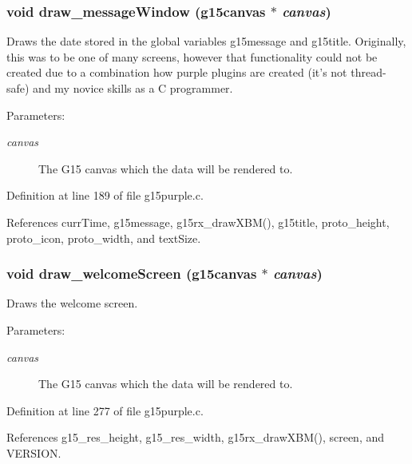 \subsubsection{\setlength{\rightskip}{0pt plus 5cm}void draw\_\-messageWindow (g15canvas $\ast$ {\em canvas})}\label{g15purple_8c_a5eb4e1291b0ae7558e4130a1c4a96eb}


Draws the date stored in the global variables g15message and g15title. Originally, this was to be one of many screens, however that functionality could not be created due to a combination how purple plugins are created (it's not thread-safe) and my novice skills as a C programmer.

\begin{Desc}
\item[Parameters:]
\begin{description}
\item[{\em canvas}]The G15 canvas which the data will be rendered to. \end{description}
\end{Desc}


Definition at line 189 of file g15purple.c.

References currTime, g15message, g15rx\_\-drawXBM(), g15title, proto\_\-height, proto\_\-icon, proto\_\-width, and textSize.
\subsubsection{\setlength{\rightskip}{0pt plus 5cm}void draw\_\-welcomeScreen (g15canvas $\ast$ {\em canvas})}\label{g15purple_8c_522e66aaf6ebeb8a2f72a1d70d799f89}


Draws the welcome screen.

\begin{Desc}
\item[Parameters:]
\begin{description}
\item[{\em canvas}]The G15 canvas which the data will be rendered to.  \end{description}
\end{Desc}


Definition at line 277 of file g15purple.c.

References g15\_\-res\_\-height, g15\_\-res\_\-width, g15rx\_\-drawXBM(), screen, and VERSION.
